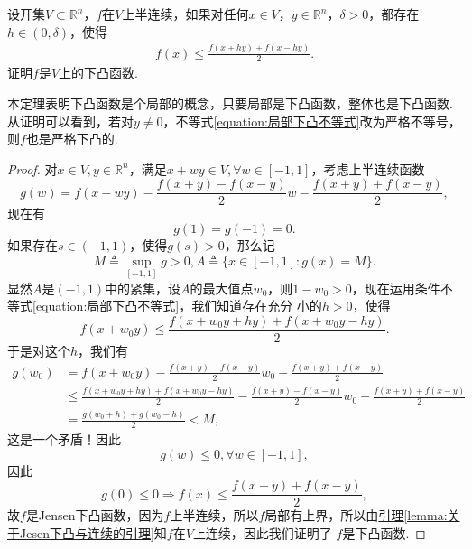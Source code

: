 \documentclass[../../main.tex]{subfiles}
\begin{document}
\begin{theorem}[下凸函数的局部定义]\label{theorem:下凸函数的局部定义}
设开集\(V\subset\mathbb{R}^n\)，\(f\)在\(V\)上半连续，如果对任何\(x\in V\)，\(y\in\mathbb{R}^n\)，\(\delta>0\)，都存在\(h\in(0,\delta)\)，使得
\begin{align}
f(x)\leqslant\frac{f(x + hy)+f(x - hy)}{2}.\label{equation:局部下凸不等式}
\end{align}
证明\(f\)是\(V\)上的下凸函数.
\end{theorem}
\begin{note}
本定理表明下凸函数是个局部的概念，只要局部是下凸函数，整体也是下凸函数. 从证明可以看到，若对\(y\neq0\)，不等式\eqref{equation:局部下凸不等式}改为严格不等号，则\(f\)也是严格下凸的.
\end{note}
\begin{proof}
对\(x\in V,y\in\mathbb{R}^n\)，满足\(x + wy\in V,\forall w\in[-1,1]\)，考虑上半连续函数
\[
g(w)=f(x + wy)-\frac{f(x + y)-f(x - y)}{2}w-\frac{f(x + y)+f(x - y)}{2},
\]
现在有
\[
g(1)=g(-1)=0.
\]
如果存在\(s\in(-1,1)\)，使得\(g(s)>0\)，那么记
\[
M\triangleq\sup_{[-1,1]}g>0,A\triangleq\{x\in[-1,1]:g(x)=M\}.
\]
显然\(A\)是\((-1,1)\)中的紧集，设\(A\)的最大值点\(w_0\)，则\(1 - w_0>0\)，现在运用条件不等式\eqref{equation:局部下凸不等式}，我们知道存在充分
小的\(h > 0\)，使得
\[
f(x + w_0y)\leqslant\frac{f(x + w_0y+hy)+f(x + w_0y - hy)}{2}.
\]
于是对这个\(h\)，我们有
\begin{align*}
g(w_0)&=f(x + w_0y)-\frac{f(x + y)-f(x - y)}{2}w_0-\frac{f(x + y)+f(x - y)}{2}\\
&\leqslant\frac{f(x + w_0y+hy)+f(x + w_0y - hy)}{2}-\frac{f(x + y)-f(x - y)}{2}w_0-\frac{f(x + y)+f(x - y)}{2}\\
&=\frac{g(w_0 + h)+g(w_0 - h)}{2}<M,
\end{align*}
这是一个矛盾！因此
\[
g(w)\leqslant0,\forall w\in[-1,1],
\]
因此
\[
g(0)\leqslant0\Rightarrow f(x)\leqslant\frac{f(x + y)+f(x - y)}{2},
\]
故\(f\)是Jensen下凸函数，因为\(f\)上半连续，所以\(f\)局部有上界，所以由\hyperref[lemma:关于Jesen下凸与连续的引理]{引理\ref{lemma:关于Jesen下凸与连续的引理}}知\(f\)在\(V\)上连续，因此我们证明了
\(f\)是下凸函数.
\end{proof}
\end{document}
